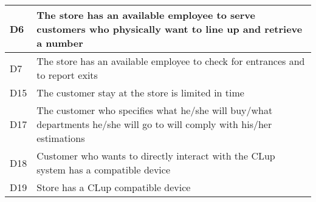 \begin{center}
{\begin{longtable}{L{2cm}L{12cm}}
        \hline
         D6 & The store has an available employee to serve customers who physically want to line up and retrieve a number \\
        \hline
         D7 & The store has an available employee to check for entrances and to report exits \\
        \hline
         D15 & The customer stay at the store is limited in time \\
        \hline
         D17 & The customer who specifies what he/she will buy/what departments he/she will go to will comply with his/her estimations \\
        \hline
         D18 & Customer who wants to directly interact with the CLup system has a compatible device \\
        \hline
         D19 & Store has a CLup compatible device \\
        \hline
    \end{longtable}}


\end{center}
